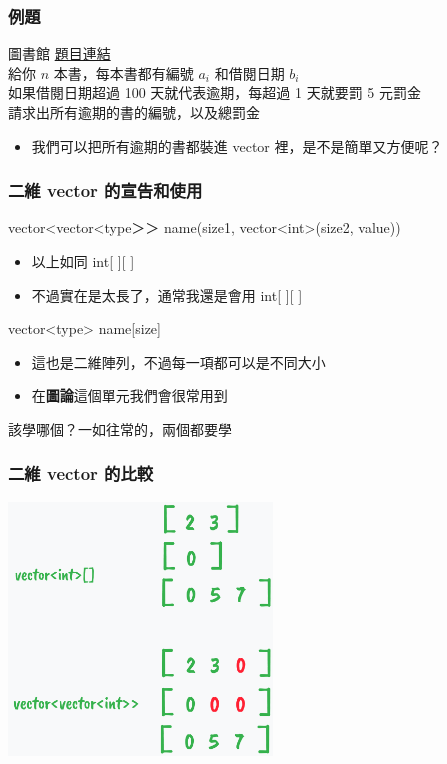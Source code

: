\documentclass{beamer}
\begin{document}
\begin{frame}
    \frametitle{例題}
    \begin{block}{圖書館}
        \href{https://zerojudge.tw/ShowProblem?problemid=f819}{題目連結}\\
        給你 $n$ 本書，每本書都有編號 $a_i$ 和借閱日期 $b_i$\\
        如果借閱日期超過 100 天就代表逾期，每超過 1 天就要罰 5 元罰金\\
        請求出所有逾期的書的編號，以及總罰金
    \end{block}
    \begin{itemize}
        \item<2-> 我們可以把所有逾期的書都裝進 vector 裡，是不是簡單又方便呢？
    \end{itemize}
\end{frame}

\begin{frame}
    \frametitle{二維 vector 的宣告和使用}
    vector<vector<{\color[rgb]{1,0,0}type}＞＞ {\color[rgb]{1,0,0}name}({\color[rgb]{1,0,0}size1}, vector<int>({\color[rgb]{1,0,0}size2}, {\color[rgb]{1,0,0}value}))
    \begin{itemize}
        \item 以上如同 int[ ][ ]
        \item 不過實在是太長了，通常我還是會用 int[ ][ ]
    \end{itemize}
    \vspace{0.5cm}
    vector<{\color[rgb]{1,0,0}type}> {\color[rgb]{1,0,0}name}[{\color[rgb]{1,0,0}size}]
    \begin{itemize}
        \item 這也是二維陣列，不過每一項都可以是不同大小
        \item 在\textbf{圖論}這個單元我們會很常用到
    \end{itemize}
    \vspace{0.5cm}
    該學哪個？一如往常的，兩個都要學
\end{frame}

\begin{frame}
    \frametitle{二維 vector 的比較}
    \vspace{0.5cm}
    \includegraphics[width=7.0cm]{img/img_5.png}
\end{frame}
\end{document}
